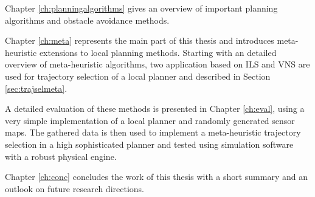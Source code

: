 Chapter \ref{ch:planningalgorithms} gives an overview of important planning algorithms and obstacle avoidance methods.
 
Chapter \ref{ch:meta} represents the main part of this thesis and introduces meta-heuristic extensions to local planning methods. 
Starting with an detailed overview of  meta-heuristic algorithms, two application based on ILS and VNS are used for trajectory selection of a local planner and described in Section \ref{sec:trajselmeta}.

A detailed evaluation of these methods is presented in Chapter \ref{ch:eval}, using a very simple implementation of a local planner and randomly generated sensor maps. 
The gathered data is then used to implement a meta-heuristic trajectory selection in a high sophisticated planner and tested using simulation software with a robust physical engine.

Chapter \ref{ch:conc} concludes the work of this thesis with a short summary and an outlook on future research directions.




